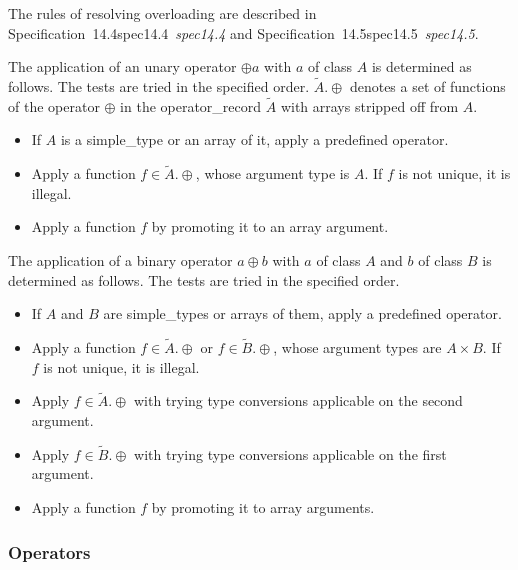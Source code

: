 \documentclass[10pt,b5paper]{article}
\def\specrefx#1#2{Specification~#1\ifx\relax#2\relax{}\else~{\it{}#2}\fi}
\def\specref#1{\specrefx{#1}{\csname spec#1\endcsname}}
\begin{document}
The rules of resolving overloading are described in \specref{14.4}\/
and \specref{14.5}.

The application of an unary operator $\oplus a$ with $a$ of class $A$
is determined as follows.  The tests are tried in the specified order.
$\tilde{A}.\oplus$ denotes a set of functions of the operator $\oplus$
in the operator_record $\tilde{A}$ with arrays stripped off from $A$.

\begin{itemize}

\item If $A$ is a simple_type or an array of it, apply a predefined
operator.

\item Apply a function $f \in \tilde{A}.\oplus$, whose argument type
is $A$.  If $f$ is not unique, it is illegal.

\item Apply a function $f$ by promoting it to an array argument.

\end{itemize}

The application of a binary operator $a \oplus b$ with $a$ of class
$A$ and $b$ of class $B$ is determined as follows.  The tests are
tried in the specified order.

\begin{itemize}

\item If $A$ and $B$ are simple_types or arrays of them, apply a
predefined operator.

\item Apply a function $f \in \tilde{A}.\oplus$ or $f \in
\tilde{B}.\oplus$, whose argument types are $A\times B$.  If $f$ is
not unique, it is illegal.

\item Apply $f \in \tilde{A}.\oplus$ with trying type conversions applicable on
the second argument.

\item Apply $f \in \tilde{B}.\oplus$ with trying type conversions
applicable on the first argument.

\item Apply a function $f$ by promoting it to array arguments.

\end{itemize}

\subsubsection*{Operators}
\end{document}
